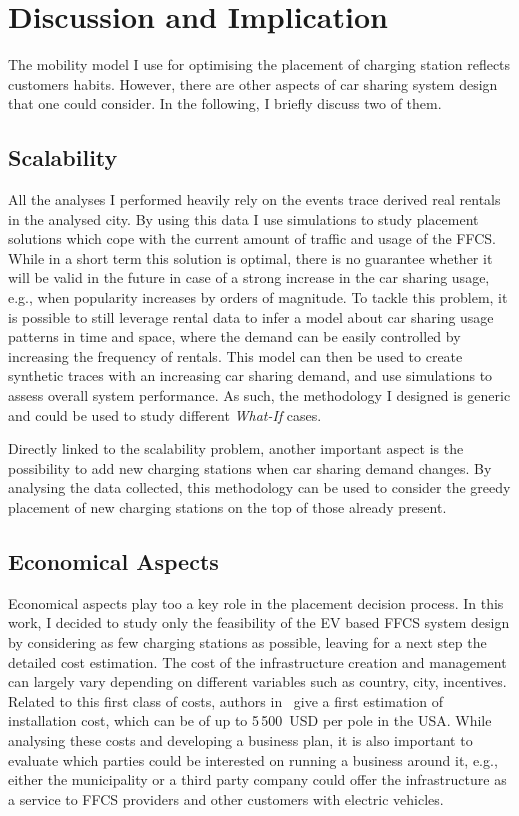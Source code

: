 \section{Discussion and Implication}
\label{sec:7_8_discussion}

The mobility model I use for optimising the placement of charging station reflects customers habits. However, there are other aspects of car sharing system design that one could consider. In the following, I briefly discuss two of them.

\subsection{Scalability}

All the analyses I performed heavily rely on the events trace derived real rentals in the analysed city. By using this data I use simulations to study placement solutions which cope with the current amount of traffic and usage of the FFCS. While in a short term this solution is optimal, there is no guarantee whether it will be valid in the future in case of a strong increase in the car sharing usage, e.g., when popularity increases by orders of magnitude. To tackle this problem, it is possible to still leverage rental data to infer a model about car sharing usage patterns in time and space, where the demand can be easily controlled by increasing the frequency of rentals. This model can then be used to create synthetic traces with an increasing car sharing demand, and use simulations to assess overall system performance. As such, the methodology I designed is generic and could be used to study different \textit{What-If} cases.

Directly linked to the scalability problem, another important aspect is the possibility to add new charging stations when car sharing demand changes. 
By analysing the data collected, this methodology can be used to consider the greedy placement of new charging stations on the top of those already present.

\subsection{Economical Aspects}


Economical aspects play too a key role in the placement decision process. In this work, I decided to study only the feasibility of the EV based FFCS system design by considering as few charging stations as possible, leaving for a next step the detailed cost estimation. The cost of the infrastructure creation and management can largely vary depending on different variables such as country, city, incentives. 
Related to this first class of costs, authors in~\cite{USAInstallCost} give a first estimation of installation cost, which can be of up to 5\,500~USD per pole in the USA. 
While analysing these costs and developing a business plan, it is also important to evaluate which parties could be interested on running a business around it, e.g., either the municipality or a third party company could offer the infrastructure as a service to FFCS providers and other customers with electric vehicles.  

